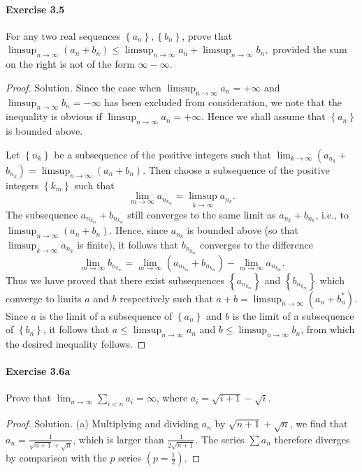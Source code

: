 \documentclass{article}
\theoremstyle{definition}
\begin{document}
\paragraph{Exercise 3.5} For any two real sequences $\left\{a_{n}\right\},\left\{b_{n}\right\}$, prove that $\limsup _{n \rightarrow \infty}\left(a_{n}+b_{n}\right) \leq \limsup _{n \rightarrow \infty} a_{n}+\limsup _{n \rightarrow \infty} b_{n},$ provided the sum on the right is not of the form $\infty-\infty$.
\begin{proof}
    Solution. Since the case when $\limsup _{n \rightarrow \infty} a_n=+\infty$ and $\limsup _{n \rightarrow \infty} b_n=-\infty$ has been excluded from consideration, we note that the inequality is obvious if $\limsup _{n \rightarrow \infty} a_n=+\infty$. Hence we shall assume that $\left\{a_n\right\}$ is bounded above.

Let $\left\{n_k\right\}$ be a subsequence of the positive integers such that $\lim _{k \rightarrow \infty}\left(a_{n_k}+\right.$ $\left.b_{n_k}\right)=\limsup _{n \rightarrow \infty}\left(a_n+b_n\right)$. Then choose a subsequence of the positive integers $\left\{k_m\right\}$ such that
$$
\lim _{m \rightarrow \infty} a_{n_{k_m}}=\limsup _{k \rightarrow \infty} a_{n_k} .
$$
The subsequence $a_{n_{k_m}}+b_{n_{k_m}}$ still converges to the same limit as $a_{n_k}+b_{n_k}$, i.e., to $\limsup _{n \rightarrow \infty}\left(a_n+b_n\right)$. Hence, since $a_{n_k}$ is bounded above (so that $\limsup _{k \rightarrow \infty} a_{n_k}$ is finite), it follows that $b_{n_{k_m}}$ converges to the difference
$$
\lim _{m \rightarrow \infty} b_{n_{k_m}}=\lim _{m \rightarrow \infty}\left(a_{n_{k_m}}+b_{n_{k_m}}\right)-\lim _{m \rightarrow \infty} a_{n_{k_m}} .
$$
Thus we have proved that there exist subsequences $\left\{a_{n_{k_m}}\right\}$ and $\left\{b_{n_{k_m}}\right\}$ which converge to limits $a$ and $b$ respectively such that $a+b=\limsup _{n \rightarrow \infty}\left(a_n+b_n^*\right)$. Since $a$ is the limit of a subsequence of $\left\{a_n\right\}$ and $b$ is the limit of a subsequence of $\left\{b_n\right\}$, it follows that $a \leq \limsup _{n \rightarrow \infty} a_n$ and $b \leq \limsup _{n \rightarrow \infty} b_n$, from which the desired inequality follows.
\end{proof}


\paragraph{Exercise 3.6a} Prove that $\lim_{n \rightarrow \infty} \sum_{i<n} a_i = \infty$, where $a_i = \sqrt{i + 1} -\sqrt{i}$.
\begin{proof}
    Solution. (a) Multiplying and dividing $a_n$ by $\sqrt{n+1}+\sqrt{n}$, we find that $a_n=\frac{1}{\sqrt{n+1}+\sqrt{n}}$, which is larger than $\frac{1}{2 \sqrt{n+1}}$. The series $\sum a_n$ therefore diverges by comparison with the $p$ series $\left(p=\frac{1}{2}\right)$.
\end{proof}
\end{document}
